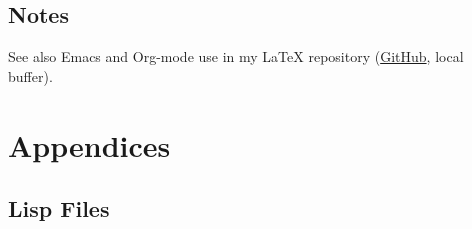 \documentclass{article}
\begin{document}
\subsection{Notes}
\label{sec:org2a2d8a2}
See also Emacs and Org-mode use in my \LaTeX{} repository (\href{https://github.com/jeszyman/latex}{GitHub}, local buffer).\\[0pt]
\section{Appendices}
\label{sec:org6e9dc25}
\subsection{Lisp Files}
\label{sec:orgf4a51a7}
\inputminted{emacs-lisp}{../emacs/init.el}

\inputminted{emacs-lisp}{../emacs/load-first.el}

\inputminted{emacs-lisp}{../emacs/load-last.el}
\end{document}
